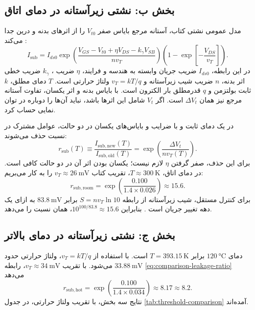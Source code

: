 \subsection*{بخش ب: نشتی زیرآستانه در دمای اتاق}
مدل عمومی نشتی کتاب، آستانه مرجع بایاس صفر \(V_{t0}\) را از اثرهای بدنه و درین جدا می‌کند
\cite[رابطه ، صفحات چاپی ۸۱ و ۸۲]{weste}\cite[اسلاید ۲۳]{nonideal}:
\begin{equation}
 I_{\mathrm{sub}}=I_{ds0}
 \exp\!\left(\frac{V_{GS}-V_{t0}+\eta V_{DS}-k_\gamma V_{SB}}{nv_T}\right)
 \left(1-\exp\!\left[-\frac{V_{DS}}{v_T}\right]\right).
 \label{eq:comparison-subthreshold-model}
\end{equation}
در این رابطه، \(I_{ds0}\) ضریب جریان وابسته به هندسه و فرایند،
\(\eta\) ضریب ،
\(k_\gamma\) ضریب خطی اثر بدنه، \(n\) ضریب شیب زیرآستانه و \(v_T=kT/q\) ولتاژ حرارتی است.
\(T\) دمای مطلق، \(k\) ثابت بولتزمن و \(q\) قدرمطلق بار الکترون است.
با بایاس بدنه و اثر  یکسان، تفاوت آستانه مرجع نیز همان \(\Delta V_t\) است.
اگر \(V_t\) شامل این اثرها باشد، نباید آن‌ها را دوباره در توان نمایی حساب کرد.

در یک دمای ثابت و با ضرایب و بایاس‌های یکسان در دو حالت، عوامل مشترک در نسبت حذف می‌شوند:
\begin{equation}
 r_{\mathrm{sub}}(T)\equiv
 \frac{I_{\mathrm{sub,new}}(T)}{I_{\mathrm{sub,old}}(T)}
 =\exp\!\left(\frac{\Delta V_t}{nv_T(T)}\right).
 \label{eq:comparison-leakage-ratio}
\end{equation}
برای این حذف، صفر گرفتن \(\eta\) لازم نیست؛ یکسان بودن اثر آن در دو حالت کافی است.
در دمای اتاق، \(T\approx\qty{300}{\kelvin}\)، تقریب کتاب \(v_T\approx\qty{26}{\milli\volt}\) را به کار می‌بریم:
\begin{equation}
 r_{\mathrm{sub,room}}=
 \exp\!\left(\frac{0.100}{1.4\times0.026}\right)
 \approx\boxed{15.6}.
 \label{eq:comparison-leakage-room}
\end{equation}
برای کنترل مستقل، شیب زیرآستانه از رابطه \(S=nv_T\ln10\) برابر
\(\qty{83.8}{\milli\volt}\) به ازای یک دهه تغییر جریان است
\cite[رابطه ]{weste}.
بنابراین \(10^{100/83.8}\approx15.6\)، همان نسبت را می‌دهد.

\subsection*{بخش ج: نشتی زیرآستانه در دمای بالاتر}
دمای \(\qty{120}{\degreeCelsius}\) برابر \(T=\qty{393.15}{\kelvin}\) است.
با استفاده از \(v_T=kT/q\)، ولتاژ حرارتی حدود \(\qty{33.88}{\milli\volt}\) می‌شود.
با تقریب \(v_T\approx\qty{34}{\milli\volt}\)، رابطه \eqref{eq:comparison-leakage-ratio} می‌دهد
\begin{equation}
 r_{\mathrm{sub,hot}}=
 \exp\!\left(\frac{0.100}{1.4\times0.034}\right)
 \approx8.17\approx\boxed{8.2}.
 \label{eq:comparison-leakage-hot}
\end{equation}
نتایج سه بخش، با تقریب ولتاژ حرارتی، در جدول \ref{tab:threshold-comparison} آمده‌اند.

